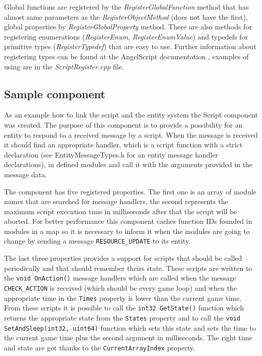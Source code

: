 Global functions are registered by the \emph{RegisterGlobalFunction} method that has almost same parameters as the \emph{RegisterObjectMethod} (does not have the first), global properties by \emph{RegisterGlobalProperty} method. There are also methods for registering enumerations (\emph{RegisterEnum}, \emph{RegisterEnumValue}) and typedefs for primitive types (\emph{RegisterTypedef}) that are easy to use. Further information about registering types can be found at the AngelScript documentation \cite{angelscript}, examples of using are in the \emph{ScriptRegister.cpp} file.

\subsection{Sample component}
\label{sub:script-component}

As an example how to link the script and the entity system the Script component was created. The purpose of this component is to provide a possibility for an entity to respond to a received message by a script. When the message is received it should find an appropriate handler, which is a script function with a strict declaration (see EntityMessageTypes.h for an entity message handler declarations), in defined modules and call it with the arguments provided in the message data.

The component has five registered properties. The first one is an array of module names that are searched for message handlers, the second represents the maximum script execution time in milliseconds after that the script will be aborted. For better performance this component caches function IDs founded in modules in a map so it is necessary to inform it when the modules are going to change by sending a message \verb/RESOURCE_UPDATE/ to its entity.

The last three properties provides a support for scripts that should be called periodically and that should remember theirs state. These scripts are written to the \verb/void OnAction()/ message handlers which are called when the message \verb/CHECK_ACTION/ is received (which should be every game loop) and when the appropriate time in the \verb/Times/ property is lower than the current game time. From these scripts it is possible to call the \verb/int32 GetState()/ function which returns the appropriate state from the \verb/States/ property and to call the \verb/void SetAndSleep(int32, uint64)/ function which sets this state and sets the time to the current game time plus the second argument in milliseconds. The right time and state are got thanks to the \verb/CurrentArrayIndex/ property.

